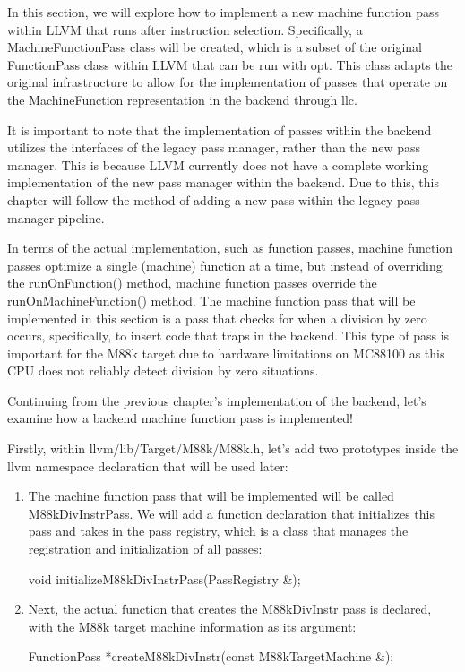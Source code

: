 
In this section, we will explore how to implement a new machine function pass within LLVM that runs after instruction selection. Specifically, a MachineFunctionPass class will be created, which is a subset of the original FunctionPass class within LLVM that can be run with opt. This class adapts the original infrastructure to allow for the implementation of passes that operate on the MachineFunction representation in the backend through llc.

It is important to note that the implementation of passes within the backend utilizes the interfaces of the legacy pass manager, rather than the new pass manager. This is because LLVM currently does not have a complete working implementation of the new pass manager within the backend. Due to this, this chapter will follow the method of adding a new pass within the legacy pass manager pipeline.

In terms of the actual implementation, such as function passes, machine function passes optimize a single (machine) function at a time, but instead of overriding the runOnFunction() method, machine function passes override the runOnMachineFunction() method. The machine function pass that will be implemented in this section is a pass that checks for when a division by zero occurs, specifically, to insert code that traps in the backend. This type of pass is important for the M88k target due to hardware limitations on MC88100 as this CPU does not reliably detect division by zero situations.

Continuing from the previous chapter’s implementation of the backend, let’s examine how a backend machine function pass is implemented!


Firstly, within llvm/lib/Target/M88k/M88k.h, let’s add two prototypes inside the llvm namespace declaration that will be used later:

\begin{enumerate}
\item
The machine function pass that will be implemented will be called M88kDivInstrPass. We will add a function declaration that initializes this pass and takes in the pass registry, which is a class that manages the registration and initialization of all passes:

\begin{cpp}
void initializeM88kDivInstrPass(PassRegistry &);
\end{cpp}

\item
Next, the actual function that creates the M88kDivInstr pass is declared, with the M88k target machine information as its argument:

\begin{cpp}
FunctionPass *createM88kDivInstr(const M88kTargetMachine &);
\end{cpp}
\end{enumerate}

